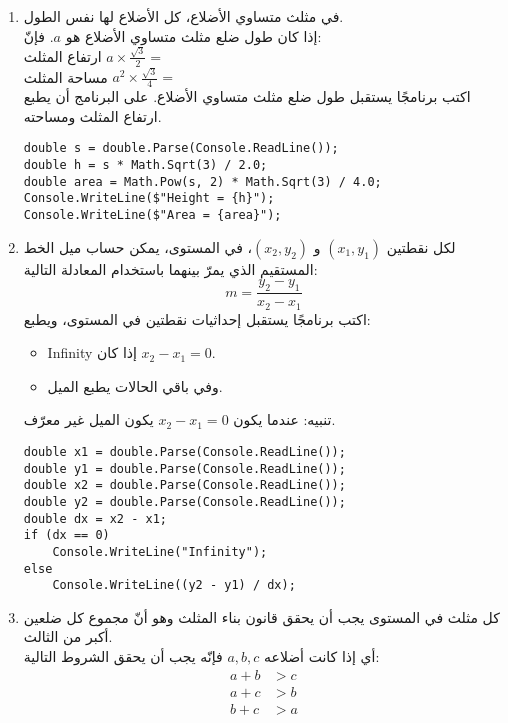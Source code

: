 \documentclass[12pt]{article}
\begin{document}
\begin{enumerate}[itemsep=2em]
\item
في مثلث متساوي الأضلاع، كل الأضلاع لها نفس الطول.\\
إذا كان طول ضلع مثلث متساوي الأضلاع هو $a$. فإنّ: \\
ارتفاع المثلث $a \times \frac{\sqrt{3}}{2} =$\\
مساحة المثلث $a^2 \times \frac{\sqrt{3}}{4} =$\\
اكتب برنامجًا يستقبل طول ضلع مثلث متساوي الأضلاع.
على البرنامج أن يطبع ارتفاع المثلث ومساحته.

\ifwithsols
\begin{boxSolution}
\begin{english}
\begin{verbatim}
double s = double.Parse(Console.ReadLine());
double h = s * Math.Sqrt(3) / 2.0;
double area = Math.Pow(s, 2) * Math.Sqrt(3) / 4.0;
Console.WriteLine($"Height = {h}");
Console.WriteLine($"Area = {area}");
\end{verbatim}
\end{english}
\end{boxSolution}
\fi


\item
لكل نقطتين $(x_1,y_1)$ و $(x_2,y_2)$، في المستوى، يمكن حساب ميل الخط المستقيم الذي يمرّ بينهما باستخدام المعادلة التالية:
\[ m = \frac{y_2 - y_1}{x_2 - x_1} \]
اكتب برنامجًا يستقبل إحداثيات نقطتين في المستوى، ويطبع:
\begin{itemize}
\item    \textenglish{Infinity} إذا كان \(x_2 - x_1 = 0\). \\
\item    وفي باقي الحالات يطبع الميل.
\end{itemize}

\ifwithsols
\begin{boxSolution}
تنبيه: عندما يكون \(x_2 - x_1 = 0\) يكون الميل غير معرّف.
\begin{english}
\begin{verbatim}
double x1 = double.Parse(Console.ReadLine());
double y1 = double.Parse(Console.ReadLine());
double x2 = double.Parse(Console.ReadLine());
double y2 = double.Parse(Console.ReadLine());
double dx = x2 - x1;
if (dx == 0)
    Console.WriteLine("Infinity");
else
    Console.WriteLine((y2 - y1) / dx);
\end{verbatim}
\end{english}
\end{boxSolution}
\fi


\item
كل مثلث في المستوى يجب أن يحقق قانون بناء المثلث وهو أنّ مجموع كل ضلعين أكبر من الثالث. \\
 أي إذا كانت أضلاعه $a, b, c$ فإنّه يجب أن يحقق الشروط التالية:
\begin{align*}
a + b &> c \\
a + c &> b \\
b + c &> a
\end{align*}


\end{enumerate}
\end{document}
